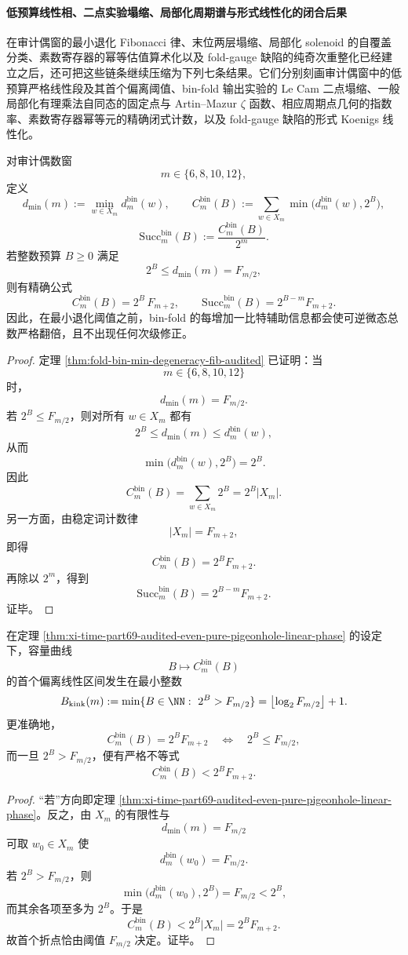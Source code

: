 \paragraph{低预算线性相、二点实验塌缩、局部化周期谱与形式线性化的闭合后果}
在审计偶窗的最小退化 Fibonacci 律、末位两层塌缩、局部化 solenoid 的自覆盖分类、素数寄存器的幂等估值算术化以及 fold-gauge 缺陷的纯奇次重整化已经建立之后，还可把这些链条继续压缩为下列七条结果。它们分别刻画审计偶窗中的低预算严格线性段及其首个偏离阈值、bin-fold 输出实验的 Le Cam 二点塌缩、一般局部化有理乘法自同态的固定点与 Artin--Mazur \(\zeta\) 函数、相应周期点几何的指数率、素数寄存器幂等元的精确闭式计数，以及 fold-gauge 缺陷的形式 Koenigs 线性化。

\begin{theorem}\label{thm:xi-time-part69-audited-even-pure-pigeonhole-linear-phase}
对审计偶数窗
\[
m\in\{6,8,10,12\},
\]
定义
\[
d_{\min}(m):=\min_{w\in X_m}d_m^{\mathrm{bin}}(w),
\qquad
C_m^{\mathrm{bin}}(B):=\sum_{w\in X_m}\min\bigl(d_m^{\mathrm{bin}}(w),2^B\bigr),
\]
\[
\mathrm{Succ}_m^{\mathrm{bin}}(B):=\frac{C_m^{\mathrm{bin}}(B)}{2^m}.
\]
若整数预算 \(B\ge 0\) 满足
\[
2^B\le d_{\min}(m)=F_{m/2},
\]
则有精确公式
\[
C_m^{\mathrm{bin}}(B)=2^B\,F_{m+2},
\qquad
\mathrm{Succ}_m^{\mathrm{bin}}(B)=2^{B-m}F_{m+2}.
\]
因此，在最小退化阈值之前，bin-fold 的每增加一比特辅助信息都会使可逆微态总数严格翻倍，且不出现任何次级修正。
\end{theorem}
\begin{proof}
定理 \ref{thm:fold-bin-min-degeneracy-fib-audited} 已证明：当
\[
m\in\{6,8,10,12\}
\]
时，
\[
d_{\min}(m)=F_{m/2}.
\]
若 \(2^B\le F_{m/2}\)，则对所有 \(w\in X_m\) 都有
\[
2^B\le d_{\min}(m)\le d_m^{\mathrm{bin}}(w),
\]
从而
\[
\min\bigl(d_m^{\mathrm{bin}}(w),2^B\bigr)=2^B.
\]
因此
\[
C_m^{\mathrm{bin}}(B)
=
\sum_{w\in X_m}2^B
=
2^B|X_m|.
\]
另一方面，由稳定词计数律
\[
|X_m|=F_{m+2},
\]
即得
\[
C_m^{\mathrm{bin}}(B)=2^BF_{m+2}.
\]
再除以 \(2^m\)，得到
\[
\mathrm{Succ}_m^{\mathrm{bin}}(B)=2^{B-m}F_{m+2}.
\]
证毕。
\end{proof}

\begin{corollary}\label{cor:xi-time-part69-binfold-first-kink}
在定理 \ref{thm:xi-time-part69-audited-even-pure-pigeonhole-linear-phase} 的设定下，容量曲线
\[
B\longmapsto C_m^{\mathrm{bin}}(B)
\]
的首个偏离线性区间发生在最小整数
\[
B_{\mathrm{kink}}(m):=\min\{B\in\NN:\ 2^B>F_{m/2}\}
=
\bigl\lfloor \log_2 F_{m/2}\bigr\rfloor+1.
\]
更准确地，
\[
C_m^{\mathrm{bin}}(B)=2^BF_{m+2}
\quad\Longleftrightarrow\quad
2^B\le F_{m/2},
\]
而一旦 \(2^B>F_{m/2}\)，便有严格不等式
\[
C_m^{\mathrm{bin}}(B)<2^BF_{m+2}.
\]
\end{corollary}
\begin{proof}
“若”方向即定理 \ref{thm:xi-time-part69-audited-even-pure-pigeonhole-linear-phase}。反之，由 \(X_m\) 的有限性与
\[
d_{\min}(m)=F_{m/2}
\]
可取 \(w_0\in X_m\) 使
\[
d_m^{\mathrm{bin}}(w_0)=F_{m/2}.
\]
若 \(2^B>F_{m/2}\)，则
\[
\min\bigl(d_m^{\mathrm{bin}}(w_0),2^B\bigr)=F_{m/2}<2^B,
\]
而其余各项至多为 \(2^B\)。于是
\[
C_m^{\mathrm{bin}}(B)<2^B|X_m|=2^BF_{m+2}.
\]
故首个折点恰由阈值 \(F_{m/2}\) 决定。证毕。
\end{proof}

